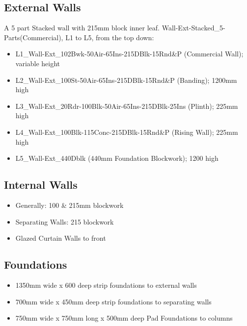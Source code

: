\subsection*{External Walls}
A 5 part Stacked wall with 215mm block inner leaf.  Wall-Ext-Stacked\_5-Parts(Commercial), L1 to L5, from the top down:
\begin{itemize}
	\item L1\_Wall-Ext\_102Bwk-50Air-65Ins-215DBlk-15Rnd\&P (Commercial Wall); variable height
	\item L2\_Wall-Ext\_100St-50Air-65Ins-215DBlk-15Rnd\&P (Banding); 1200mm high
	\item L3\_Wall-Ext\_20Rdr-100Blk-50Air-65Ins-215DBlk-25Ins (Plinth); 225mm high
	\item L4\_Wall-Ext\_100Blk-115Conc-215DBlk-15Rnd\&P (Rising Wall); 225mm high
	\item L5\_Wall-Ext\_440Dblk (440mm Foundation Blockwork); 1200 high
\end{itemize}




\subsection*{Internal Walls}
\begin{itemize}
	\item Generally: 100 \& 215mm blockwork
	\item Separating Walls: 215 blockwork
	\item Glazed Curtain Walls to front
\end{itemize}



\subsection*{Foundations}
\begin{itemize}
	\item 1350mm wide x 600  deep strip foundations to external walls
	\item 700mm wide x 450mm deep strip foundations to separating walls
	\item 750mm wide x 750mm long x 500mm deep Pad Foundations to columns
\end{itemize}


